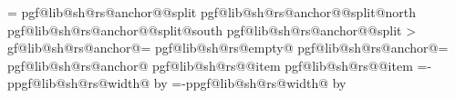 {{{                                \pgf@x=\pgf@xa%
                            }%
                            \expandafter\pgfextract@process\csname pgf@lib@sh@rs@anchor@\pgf@lib@sh@rs@number @split\endcsname{%
                                \centerpoint%
                                \pgf@x=\pgf@xa%
                            }%
                            \expandafter\addtosavedmacro\csname pgf@lib@sh@rs@anchor@\pgf@lib@sh@rs@number @split@north\endcsname%
                            \expandafter\addtosavedmacro\csname pgf@lib@sh@rs@anchor@\pgf@lib@sh@rs@number @split@south\endcsname%
                            \expandafter\addtosavedmacro\csname pgf@lib@sh@rs@anchor@\pgf@lib@sh@rs@number @split\endcsname%
                        \fi%
                    \fi%
            \repeatpgfmathloop%
        \else%
            \pgf@y=0pt\relax%
            \pgfmathloop%
                \ifnum\pgfmathcounter>\parts%
                \else%
                    \pgf@lib@sh@getalpha\pgf@lib@sh@rs@number{\pgfmathcounter}%
                    \expandafter\let\csname pgf@lib@sh@rs@anchor@\pgf@lib@sh@rs@number\endcsname=\pgfutil@empty%
                    \expandafter\ifx\csname pgf@lib@sh@rs@empty@\pgf@lib@sh@rs@number\endcsname\pgfutil@empty%
                        \ifpgfrectanglesplitignoreemptyparts%
                            \expandafter\let\csname pgf@lib@sh@rs@anchor@\pgf@lib@sh@rs@number\endcsname=%
                                \pgf@lib@sh@rs@lastanchor%
                        \fi%
                    \fi%
                    \expandafter\ifx\csname pgf@lib@sh@rs@anchor@\pgf@lib@sh@rs@number\endcsname\pgfutil@empty%
                        \expandafter\ifx\csname pgf@lib@sh@rs@\pgf@lib@sh@rs@number @item\endcsname%
                                \pgf@lib@sh@rs@lefttext%
                            \pgf@x=0pt\relax%
                        \else%
                            \expandafter\ifx\csname pgf@lib@sh@rs@\pgf@lib@sh@rs@number @item\endcsname%
                                    \pgf@lib@sh@rs@righttext%
                                \pgf@x=-\csname pgf@lib@sh@rs@width@\pgf@lib@sh@rs@number\endcsname\relax%
                                \advance\pgf@x by\pgf@lib@sh@rs@max@width\relax%
                            \else%
                                \pgf@x=-\csname pgf@lib@sh@rs@width@\pgf@lib@sh@rs@number\endcsname\relax%
                                \advance\pgf@x by\pgf@lib@sh@rs@max@width\relax%
}}
